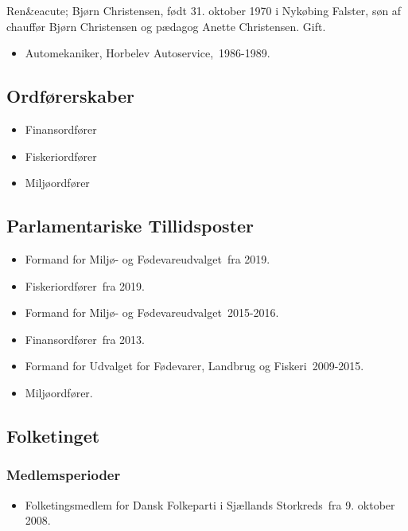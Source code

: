 \documentclass[11pt, a4paper]{awesome-cv}
\begin{document}
\makecvheader[R]
\makelettertitle
\begin{cvletter}
Ren&eacute; Bjørn Christensen, født 31. oktober 1970 i Nykøbing Falster, søn af chauffør Bjørn Christensen og pædagog Anette Christensen. Gift.

\begin{itemize}
\item Automekaniker, Horbelev Autoservice, 1986-1989.
\end{itemize}
\subsection*{Ordførerskaber}
\begin{itemize}
\item Finansordfører
\item Fiskeriordfører
\item Miljøordfører
\end{itemize}
\subsection*{Parlamentariske Tillidsposter}
\begin{itemize}
\item Formand for Miljø- og Fødevareudvalget fra 2019.
\item Fiskeriordfører fra 2019.
\item Formand for Miljø- og Fødevareudvalget 2015-2016.
\item Finansordfører fra 2013.
\item Formand for Udvalget for Fødevarer, Landbrug og Fiskeri 2009-2015.
\item Miljøordfører.
\end{itemize}
\subsection*{Folketinget}
\subsubsection*{Medlemsperioder}
\begin{itemize}
\item Folketingsmedlem for Dansk Folkeparti i Sjællands Storkreds fra 9. oktober 2008.
\end{itemize}

\end{cvletter}
\end{document}
